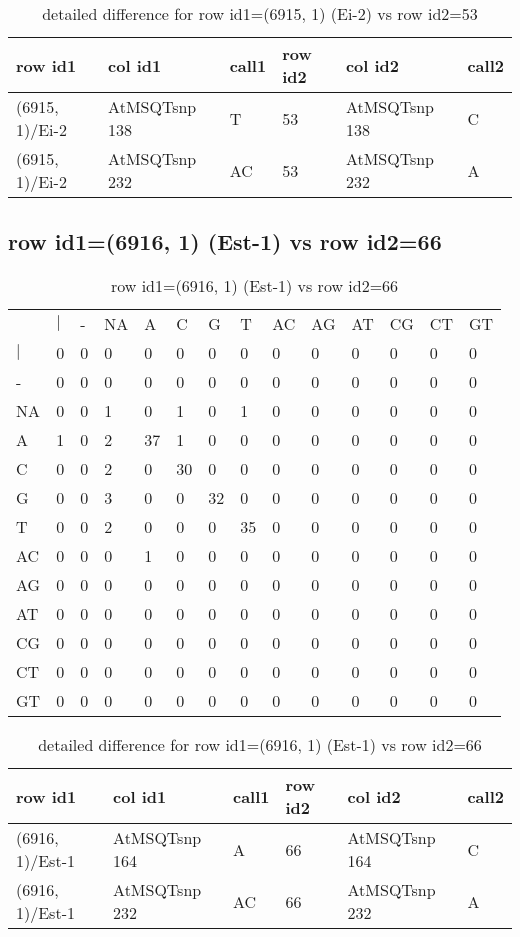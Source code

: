 \begin{center}
\begin{longtable}{|l|l|l|l|l|l|}
\caption{detailed difference for row id1=(6915, 1) (Ei-2) vs row id2=53} \label{table_dm97}\\
\hline
row id1&col id1&call1&row id2&col id2&call2\\
\hline
(6915, 1)/Ei-2&AtMSQTsnp 138&T&53&AtMSQTsnp 138&C\\
(6915, 1)/Ei-2&AtMSQTsnp 232&AC&53&AtMSQTsnp 232&A\\
\hline
\end{longtable}
\end{center}

\subsection{row id1=(6916, 1) (Est-1) vs row id2=66}
\begin{center}
\begin{longtable}{|l|l|l|l|l|l|l|l|l|l|l|l|l|l|}
\caption{row id1=(6916, 1) (Est-1) vs row id2=66} \label{table_dm98}\\
\hline
\\
\hline
&$|$&-&NA&A&C&G&T&AC&AG&AT&CG&CT&GT\\
$|$&0&0&0&0&0&0&0&0&0&0&0&0&0\\
-&0&0&0&0&0&0&0&0&0&0&0&0&0\\
NA&0&0&1&0&1&0&1&0&0&0&0&0&0\\
A&1&0&2&37&1&0&0&0&0&0&0&0&0\\
C&0&0&2&0&30&0&0&0&0&0&0&0&0\\
G&0&0&3&0&0&32&0&0&0&0&0&0&0\\
T&0&0&2&0&0&0&35&0&0&0&0&0&0\\
AC&0&0&0&1&0&0&0&0&0&0&0&0&0\\
AG&0&0&0&0&0&0&0&0&0&0&0&0&0\\
AT&0&0&0&0&0&0&0&0&0&0&0&0&0\\
CG&0&0&0&0&0&0&0&0&0&0&0&0&0\\
CT&0&0&0&0&0&0&0&0&0&0&0&0&0\\
GT&0&0&0&0&0&0&0&0&0&0&0&0&0\\
\hline
\end{longtable}
\end{center}

\begin{center}
\begin{longtable}{|l|l|l|l|l|l|}
\caption{detailed difference for row id1=(6916, 1) (Est-1) vs row id2=66} \label{table_dm99}\\
\hline
row id1&col id1&call1&row id2&col id2&call2\\
\hline
(6916, 1)/Est-1&AtMSQTsnp 164&A&66&AtMSQTsnp 164&C\\
(6916, 1)/Est-1&AtMSQTsnp 232&AC&66&AtMSQTsnp 232&A\\
\hline
\end{longtable}
\end{center}

